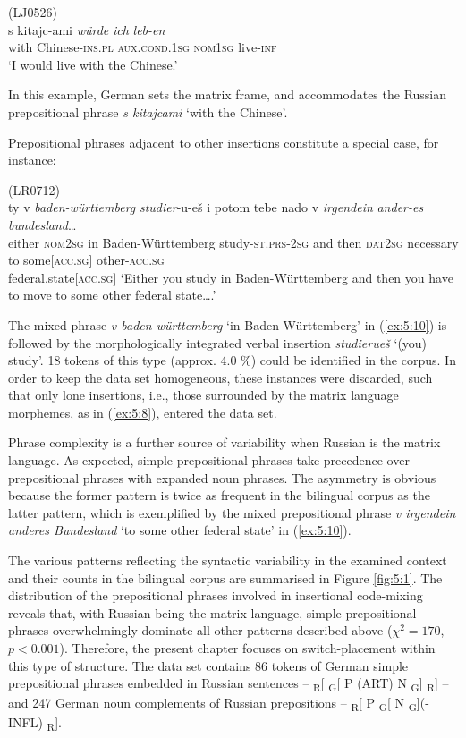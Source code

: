 \ea
\label{ex:5:9}
(LJ0526)\\
\gll s kitajc-ami \textit{würde} \textit{ich} \textit{leb-en}\\
	{with} Chinese-\textsc{ins.pl} \textsc{aux.cond.1sg} \textsc{nom1sg} live-\textsc{inf}\\
\glt `I would live with the Chinese.'
\z

\noindent
In this example, German sets the matrix frame, and accommodates the Russian prepositional phrase \textit{s kitajcami} `with the Chinese'. 

Prepositional phrases adjacent to other insertions constitute a special case, for instance:

\ea
\label{ex:5:10}
(LR0712)\\
 {ty} {v} \textit{baden-württemberg} \textit{studier}-{u-eš} {i} {potom} {tebe} {nado} {v} \textit{irgendein} \textit{ander-es} \textit{bundesland}\dots{}\\
	{either} \textsc{nom2sg} in Baden-Württemberg study-\textsc{st.prs-2sg} and then \textsc{dat2sg} necessary to some\([\)\textsc{acc.sg}\(]\) other-\textsc{acc.sg}\\ federal.state\([\)\textsc{acc.sg}\(]\)
\glt `Either you study in Baden-Württemberg and then you have to move to some other federal state\dots{}.'
\z

\noindent The mixed phrase \textit{v baden-württemberg} `in Baden-Württemberg' in (\ref{ex:5:10}) is followed by the morphologically integrated verbal insertion \textit{studierueš} `(you) study'. 18 tokens of this type (approx. 4.0 \%) could be identified in the corpus. In order to keep the data set homogeneous, these instances were discarded, such that only lone insertions, i.e., those surrounded by the matrix language morphemes, as in (\ref{ex:5:8}), entered the data set.

Phrase complexity is a further source of variability  when Russian is the matrix language. As expected, simple prepositional phrases take precedence over prepositional phrases with expanded noun phrases. The asymmetry is obvious because the former pattern is twice as frequent in the bilingual corpus as the latter pattern, which is exemplified by the mixed prepositional phrase \textit{v irgendein anderes Bundesland} `to some other federal state' in (\ref{ex:5:10}). 

The various patterns reflecting the syntactic variability in the examined context and their counts in the bilingual corpus are summarised in Figure \ref{fig:5:1}. The distribution of the prepositional phrases involved in insertional code-mixing reveals that, with Russian being the matrix language, simple prepositional phrases overwhelmingly dominate all other patterns described above ($\chi^2 = 170$, $p < 0.001$). Therefore, the present chapter focuses on switch-placement within this type of structure. The data set contains 86 tokens of German simple prepositional phrases embedded in Russian sentences -- \textsubscript{R}[ \textsubscript{G}[ P (ART) N \textsubscript{G}] \textsubscript{R}] -- and 247 German noun complements of Russian prepositions -- \textsubscript{R}[ P \textsubscript{G}[ N  \textsubscript{G}](-INFL) \textsubscript{R}].

